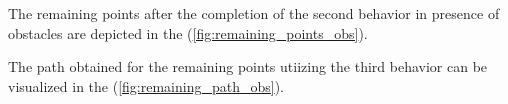 



The remaining points after the completion of the second behavior in presence of obstacles are depicted in the (\autoref{fig:remaining_points_obs}). 




The path obtained for the remaining points utiizing the third behavior can be visualized in the (\autoref{fig:remaining_path_obs}). 


